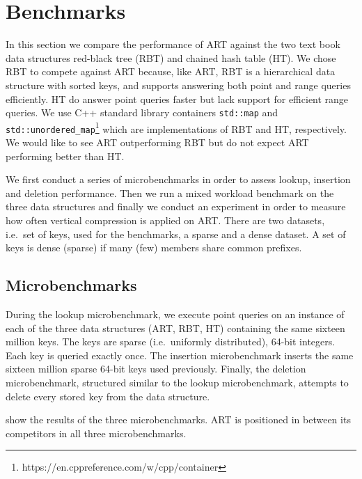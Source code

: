 \documentclass[abstracton,12pt]{scrartcl}
\theoremstyle{definition}
\begin{document}
\newpage

\section{Benchmarks}\label{sec:benchmarks}

In this section we compare the performance of ART against the two text book
data structures red-black tree (RBT) and chained hash table (HT).
We chose RBT to compete against ART because, like ART, RBT is a hierarchical
data structure with sorted keys, and supports answering both point and range
queries efficiently. HT do answer point queries faster but lack support for
efficient range queries. We use C++ standard library containers 
\texttt{std::map} and \texttt{std::unordered\_map}\footnote{https://en.cppreference.com/w/cpp/container}
which are implementations of RBT and HT, respectively.
We would like to see ART outperforming RBT but do not expect ART performing
better than HT. 

We first conduct a series of microbenchmarks in order to assess lookup,
insertion and deletion performance. Then we run a mixed workload benchmark
on the three data structures and finally we conduct an experiment in order
to measure how often vertical compression is applied on ART. There are two 
datasets, i.e.\ set of keys, used for the benchmarks, a sparse
and a dense dataset. A set of keys is dense (sparse) if many (few) members
share common prefixes.

\vspace{-3mm}
\subsection{Microbenchmarks}\label{sec:microbenchmarks}

During the lookup microbenchmark, we execute point queries on an instance
of each of the three data structures (ART, RBT, HT)
containing the same sixteen million keys. The keys are sparse (i.e.\ uniformly
distributed), 64-bit integers. Each key is queried exactly once.
The insertion microbenchmark inserts the same sixteen million sparse 64-bit keys
used previously. Finally, the deletion microbenchmark, structured similar to 
the lookup microbenchmark, attempts to delete every stored key from the data 
structure.

show the results of the three microbenchmarks. ART is positioned in between 
its competitors in all three microbenchmarks.
\end{document}
